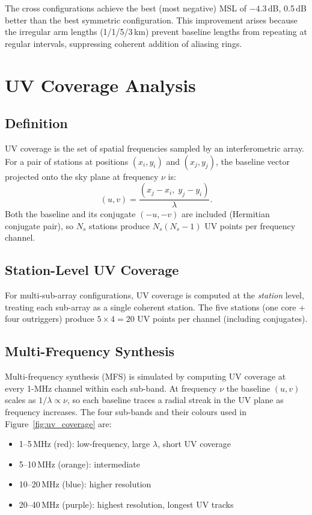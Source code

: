 \documentclass[12pt,a4paper]{article}
\begin{document}
The cross configurations achieve the best (most negative) MSL of $-4.3$\,dB,
0.5\,dB better than the best symmetric configuration.
This improvement arises because the irregular arm lengths (1/1/5/3\,km)
prevent baseline lengths from repeating at regular intervals, suppressing
coherent addition of aliasing rings.

\section{UV Coverage Analysis}
\label{sec:uv}

\subsection{Definition}

UV coverage is the set of spatial frequencies sampled by an interferometric
array.
For a pair of stations at positions $(x_i, y_i)$ and $(x_j, y_j)$, the
baseline vector projected onto the sky plane at frequency $\nu$ is:
\begin{equation}
  (u, v) = \frac{(x_j - x_i,\; y_j - y_i)}{\lambda}.
\end{equation}
Both the baseline and its conjugate $(-u, -v)$ are included (Hermitian
conjugate pair), so $N_s$ stations produce $N_s(N_s-1)$ UV points per
frequency channel.

\subsection{Station-Level UV Coverage}

For multi-sub-array configurations, UV coverage is computed at the
\emph{station} level, treating each sub-array as a single coherent station.
The five stations (one core + four outriggers) produce $5 \times 4 = 20$ UV
points per channel (including conjugates).

\subsection{Multi-Frequency Synthesis}

Multi-frequency synthesis (MFS) is simulated by computing UV coverage at every
1-MHz channel within each sub-band.
At frequency $\nu$ the baseline $(u,v)$ scales as $1/\lambda \propto \nu$, so
each baseline traces a radial streak in the UV plane as frequency increases.
The four sub-bands and their colours used in Figure~\ref{fig:uv_coverage} are:
\begin{itemize}
  \item 1--5\,MHz (red): low-frequency, large $\lambda$, short UV coverage
  \item 5--10\,MHz (orange): intermediate
  \item 10--20\,MHz (blue): higher resolution
  \item 20--40\,MHz (purple): highest resolution, longest UV tracks
\end{itemize}
\end{document}
